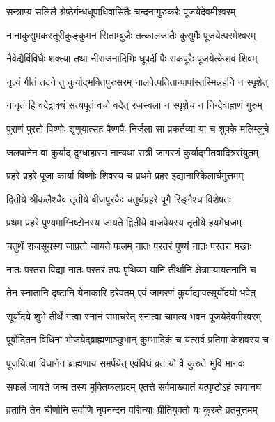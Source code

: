\twolineshloka
{सन्त्राप्य सलिलै श्रेष्ठेर्गन्धधूपाधिवासितैः}
{चन्दनागुरुकरैः पूजयेदेवमीश्वरम्} %

\twolineshloka
{नानाकुसुमकस्तूरीकुङ्कुमन सिताम्बुजैः}
{तत्कालजातैः कुसुमैः पूजयेत्परमेश्वरम्} %

\twolineshloka
{नैवेद्यैर्विविधैः शक्त्या तथा नीराजनादिभिः}
{धूपर्दी पैः सकपूरैः पूजयेत्केशवं शिवम्} %

\twolineshloka
{नृत्यं गीतं तदने तु कुर्याद्भक्तिपुरःसरम्}
{नालपेत्पतितान्पापांस्तस्मिन्नहनि न स्पृशेत्} %

\twolineshloka
{नानृतं हि वदेद्वाक्यं सत्यपूतं वचो वदेत्}
{रजस्वला न स्पृशेच न निन्देवाह्मणं गुरुम्} %

\twolineshloka
{पुराणं पुरतो विष्णोः शृणुयात्सह वैष्णवैः}
{निर्जला सा प्रकर्तव्या या च शुक्के मलिम्लुचे} %

\twolineshloka
{जलपानेन वा कुर्याद् दुग्धाहारण नान्यथा}
{रात्री जागरणं कुर्याद्गीतवादित्रसंयुतम्} %

\twolineshloka
{प्रहरे प्रहरे पूजा कार्या विष्णोः शिवस्य च}
{प्रथमे प्रहर इद्यानारिकेलार्घमुत्तमम्} %

\twolineshloka
{द्वितीये श्रीकलैश्चैव तृतीये बीजपूरकैः}
{चतुर्थप्रहरे पूगै रिङ्गैश्च विशेषतः} %

\twolineshloka
{प्रथम प्रहरे पुण्यमाग्निष्टोनस्य जायते}
{द्वितीये वाजपेयस्य तृतीये हयमेधजम्} %

\twolineshloka
{चतुथें राजसूयस्य जाप्रतो जायते फलम्}
{नातः परतरं पुण्यं नातः परतरा मखाः} %

\twolineshloka
{नातः परतरा विद्या नातः परतरं तपः}
{पृथिव्यां यानि तीर्थानि क्षेत्राण्यायतनानि च} %

\twolineshloka
{तेन स्नातानि दृष्टानि येनाकारि हरेवतम्}
{एवं जागरणं कुर्याद्यावत्सूर्योदयो भवेत्} %

\twolineshloka
{सूर्योदये शुभे तीर्थे गत्वा स्नानं समाचरेत्}
{स्नात्वा चामत्य भवनं पूजयेदेवमीश्वरम्} %

\twolineshloka
{पूर्वोदितन विधिना भोजयेद्ब्राह्मणाञ्छुभान्}
{कुम्भादिकं च यत्सर्व प्रतिमा केशवस्य च} %

\twolineshloka
{पूजयित्वा विधानेन ब्राह्मणाय समर्पयेत्}
{एवंविधं व्रतं यो वै कुरुते भुवि मानवः} %

\twolineshloka
{सफलं जायते जन्म तस्य मुक्तिफलप्रदम्}
{एतत्ते सर्वमाख्यातं यत्पृष्टोऽहं त्वयानघ} %

\twolineshloka
{व्रतानि तेन चीर्णानि सर्वाणि नृपनन्दन}
{पद्मिन्याः प्रीतियुक्तो यः कुरुते व्रतमुत्तमम्} %

